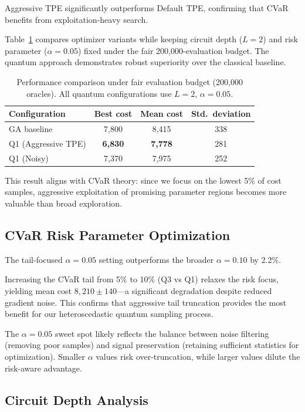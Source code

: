 Aggressive TPE significantly outperforms Default TPE, confirming that CVaR 
benefits from exploitation-heavy search.

Table~\ref{tab:optimisers} compares optimizer variants while keeping circuit 
depth ($L=2$) and risk parameter ($\alpha=0.05$) fixed under the fair 
200{,}000-evaluation budget. The quantum approach demonstrates robust 
superiority over the classical baseline.

\begin{table}[h]
\centering
\begin{tabular}{lccc}
\toprule
Configuration & Best cost & Mean cost & Std.\ deviation \\
\midrule
GA baseline & 7{,}800 & 8{,}415 & 338 \\
Q1 (Aggressive TPE) & \textbf{6{,}830} & \textbf{7{,}778} & 281 \\
Q1 (Noisy) & 7{,}370 & 7{,}975 & 252 \\
\bottomrule
\end{tabular}
\caption{Performance comparison under fair evaluation budget (200{,}000 oracles). 
         All quantum configurations use $L=2$, $\alpha=0.05$.}
\label{tab:optimisers}
\end{table}

This result aligns with CVaR theory: since we focus on the lowest 5\% of cost 
samples, aggressive exploitation of promising parameter regions becomes more 
valuable than broad exploration.

\subsection{CVaR Risk Parameter Optimization}

The tail-focused $\alpha=0.05$ setting outperforms the broader $\alpha=0.10$ 
by 2.2\%.

Increasing the CVaR tail from 5\% to 10\% (Q3 vs Q1) relaxes the risk focus, 
yielding mean cost $8{,}210\pm140$—a significant degradation despite reduced 
gradient noise. This confirms that aggressive tail truncation provides the 
most benefit for our heteroscedastic quantum sampling process.

The $\alpha=0.05$ sweet spot likely reflects the balance between noise filtering 
(removing poor samples) and signal preservation (retaining sufficient statistics 
for optimization). Smaller $\alpha$ values risk over-truncation, while larger 
values dilute the risk-aware advantage.

\subsection{Circuit Depth Analysis}


